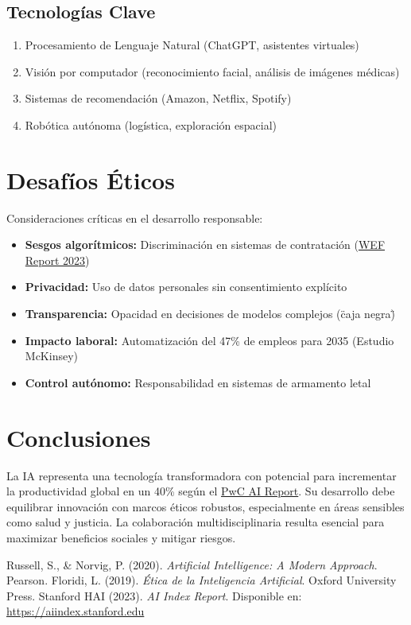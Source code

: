 \documentclass[12pt,a4paper]{article}
\begin{document}
\subsection*{Tecnologías Clave}
\begin{enumerate}[label=\textbf{\arabic*.}]
\item Procesamiento de Lenguaje Natural (ChatGPT, asistentes virtuales)
\item Visión por computador (reconocimiento facial, análisis de imágenes médicas)
\item Sistemas de recomendación (Amazon, Netflix, Spotify)
\item Robótica autónoma (logística, exploración espacial)
\end{enumerate}

\section{Desafíos Éticos}
Consideraciones críticas en el desarrollo responsable:

\begin{itemize}
\item \textbf{Sesgos algorítmicos:} Discriminación en sistemas de contratación (\href{https://www.weforum.org}{WEF Report 2023})
\item \textbf{Privacidad:} Uso de datos personales sin consentimiento explícito
\item \textbf{Transparencia:} Opacidad en decisiones de modelos complejos (\"caja negra\")
\item \textbf{Impacto laboral:} Automatización del 47\% de empleos para 2035 (Estudio McKinsey)
\item \textbf{Control autónomo:} Responsabilidad en sistemas de armamento letal
\end{itemize}

\section*{Conclusiones}
La IA representa una tecnología transformadora con potencial para incrementar la productividad global en un 40\% según el \href{https://www.pwc.com}{PwC AI Report}. Su desarrollo debe equilibrar innovación con marcos éticos robustos, especialmente en áreas sensibles como salud y justicia. La colaboración multidisciplinaria resulta esencial para maximizar beneficios sociales y mitigar riesgos.

\begin{thebibliography}{9}
 Russell, S., \& Norvig, P. (2020). \textit{Artificial Intelligence: A Modern Approach}. Pearson.
 Floridi, L. (2019). \textit{Ética de la Inteligencia Artificial}. Oxford University Press.
 Stanford HAI (2023). \textit{AI Index Report}. Disponible en: \url{https://aiindex.stanford.edu}
\end{thebibliography}
\end{document}
